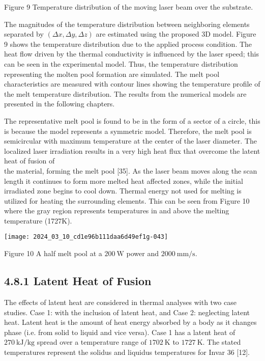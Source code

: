 \documentclass[10pt]{article}
\begin{document}
Figure 9 Temperature distribution of the moving laser beam over the substrate.

The magnitudes of the temperature distribution between neighboring elements separated by $(\Delta x, \Delta y, \Delta z)$ are estimated using the proposed 3D model. Figure 9 shows the temperature distribution due to the applied process condition. The heat flow driven by the thermal conductivity is influenced by the laser speed; this can be seen in the experimental model. Thus, the temperature distribution representing the molten pool formation are simulated. The melt pool characteristics are measured with contour lines showing the temperature profile of the melt temperature distribution. The results from the numerical models are presented in the following chapters.

The representative melt pool is found to be in the form of a sector of a circle, this is because the model represents a symmetric model. Therefore, the melt pool is semicircular with maximum temperature at the center of the laser diameter. The localized laser irradiation results in a very high heat flux that overcome the latent heat of fusion of\\
the material, forming the melt pool [35]. As the laser beam moves along the scan length it continues to form more melted heat affected zones, while the initial irradiated zone begins to cool down. Thermal energy not used for melting is utilized for heating the surrounding elements. This can be seen from Figure 10 where the gray region represents temperatures in and above the melting temperature (1727K).

\begin{center}
\texttt{[image: 2024\_03\_10\_cd1e96b111daa6d49ef1g-043]}
\end{center}

Figure 10 A half melt pool at a $200 \mathrm{~W}$ power and $2000 \mathrm{~mm} / \mathrm{s}$.

\subsection*{4.8.1 Latent Heat of Fusion}
The effects of latent heat are considered in thermal analyses with two case studies. Case 1: with the inclusion of latent heat, and Case 2: neglecting latent heat. Latent heat is the amount of heat energy absorbed by a body as it changes phase (i.e. from solid to liquid and vice versa). Case 1 has a latent heat of $270 \mathrm{~kJ} / \mathrm{kg}$ spread over a temperature range of $1702 \mathrm{~K}$ to $1727 \mathrm{~K}$. The stated temperatures represent the solidus and liquidus temperatures for Invar 36 [12].
\end{document}
